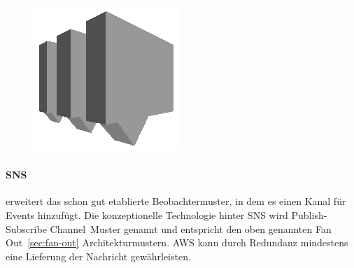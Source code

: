 \documentclass[
12pt,
english,
ngerman,
headsepline,
twoside,
openright,
numbers=noenddot,version=first
]{scrreprt}
\begin{document}
\begin{figure}
	\includegraphics[width=0.9\linewidth]{./pics/aws/Messaging_GRAYSCALE_AmazonSNS.eps}
\end{figure}
\paragraph{\acrfull{SNS}}\label{par:sns} erweitert das schon gut etablierte Beobachtermuster, in dem es einen Kanal für Events hinzufügt. Die konzeptionelle Technologie hinter \acrshort{SNS} wird \glqq Publish-Subscribe Channel\cite{patternIntegrationEnterprise}\grqq\ Muster genannt und entspricht den oben genannten \glqq Fan Out\grqq\ \autoref{sec:fan-out} Architekturmustern. AWS kann durch Redundanz mindestens eine Lieferung der Nachricht gewährleisten.
\end{document}
